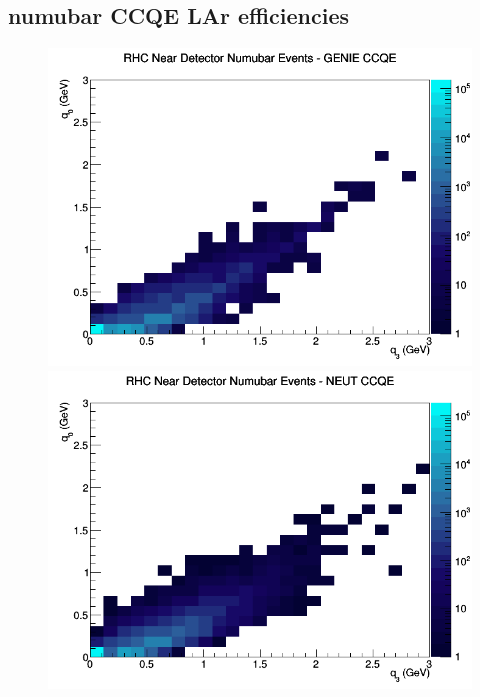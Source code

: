 \subsection{numubar CCQE LAr efficiencies}
\begin{figure}[h]
\includegraphics[width=\linewidth]{eff_q0_q3/LAr/CCQE_RHC_ND_numubar_q3_q0_GENIE.png}
\endminipage
{}
\includegraphics[width=\linewidth]{eff_q0_q3/LAr/CCQE_RHC_ND_numubar_q3_q0_NEUT.png}
\endminipage
{}

\end{figure}
